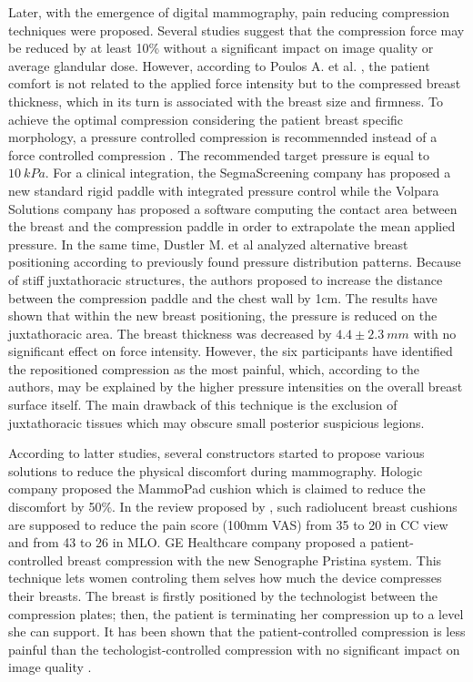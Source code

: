 Later, with the emergence of digital mammography, pain reducing compression techniques were proposed. Several studies \citep{chida_reduced_2009,saunders_effect_2008} suggest that the compression force may be reduced by at least 10\% without a significant impact on image quality or average glandular dose. However, according to Poulos A. et al. \cite{poulos_breast_2003}, the patient comfort is not related to the applied force intensity but to the compressed breast thickness, which in its turn is associated with the breast size and firmness. To achieve the optimal compression considering the patient breast specific morphology, a pressure controlled compression is recommennded instead of a force controlled compression \citep{de_pain_2015}. The recommended target pressure is equal to $10\ kPa$. For a clinical integration, the SegmaScreening company has proposed a new standard rigid paddle with integrated pressure control while the Volpara Solutions company has proposed a software computing the contact area between the breast and the compression paddle in order to extrapolate the mean applied pressure.  In the same time, Dustler M. et al \cite{dustler_effect_2012} analyzed alternative breast positioning according to previously found pressure distribution patterns. Because of stiff juxtathoracic structures, the authors proposed to increase the distance between the compression paddle and the chest wall by 1cm. The results have shown that within the new breast positioning, the pressure is reduced on the juxtathoracic area. The breast thickness was decreased by $4.4\pm2.3 \ mm$ with no significant effect on force intensity. However, the six participants have identified the repositioned compression as the most painful, which, according to the authors, may be explained by the higher pressure intensities on the overall breast surface itself.  The main drawback of this technique is the exclusion of juxtathoracic tissues which may obscure small posterior suspicious legions. 
 
According to latter studies, several constructors started to propose various solutions to reduce the physical discomfort during mammography. Hologic company proposed the MammoPad cushion which is claimed to reduce the discomfort by 50\%. In the review proposed by \cite{miller_interventions_2008}, such radiolucent breast cushions are supposed to reduce the pain score (100mm VAS) from 35 to 20 in CC view and from 43 to 26 in MLO. GE Healthcare company proposed a patient-controlled breast compression with the new Senographe Pristina system. This technique lets women controling them selves how much the device compresses their breasts.  The breast is firstly positioned by the technologist between the compression plates; then, the patient is terminating her compression up to a level she can support. It has been shown that the patient-controlled compression is less painful than the techologist-controlled compression with no significant impact on image quality  \citep{miller_interventions_2008}.

